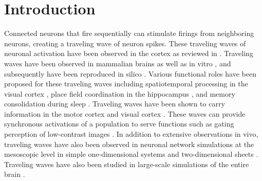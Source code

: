 
\chapter{Introduction}
Connected neurons that fire sequentially can stimulate firings from neighboring neurons, creating a traveling wave of neuron spikes. 
These traveling waves of neuronal activation have been observed in the cortex as reviewed in \citet{Muller2018}.
Traveling waves have been observed in mammalian brains \citep{Golomb1997}\citep{reimer2010}\citep{Sato2012}  as well as in vitro \citep{wu2008}\citep{huang2004}\citep{Golomb1999}, 
and subsequently have been reproduced in silico \citep{keane2015}\citep{Senk2020}\citep{Golomb1996}\citep{ermentrout2001}. 
Various functional roles have been proposed for these traveling waves including spatiotemporal processing in the visual cortex \citep{Chemla2019}\citep{Muller2014}\citep{Nauhaus2009}, 
place field coordination in the hippocampus \citep{lubernov2009}, and memory consolidation during sleep \citep{Dickey2021}.
Traveling waves have been shown to carry information in the  motor cortex \citep{Rubino2006} and visual cortex \citep{Besserve2015}.
These waves can provide synchronous activations of a population to serve functions such as gating perception of low-contrast images \citep{Davis2020}.
In addition to extensive observations in vivo, traveling waves have also been observed in neuronal network simulations at the mesoscopic level 
in simple one-dimensional systems \citep{Wilson1973}\citep{Golomb1999} and two-dimensional sheets \citep{keane2015}\citep{Pyle2017}\citep{Townsend2018}.
Traveling waves have also been studied in large-scale simulations of the entire brain \citep{Roberts2019}.


